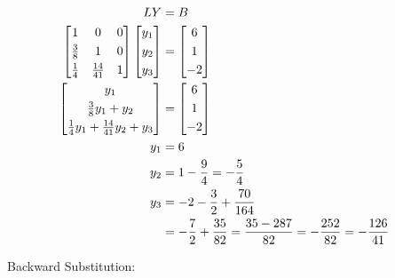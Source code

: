 	\begin{align}
		LY &= B& \\
		\begin{bmatrix}
			1 & 0 & 0 \\[0.3em]
			\frac{3}{8} & 1 & 0 \\[0.3em]
			\frac{1}{4} & \frac{14}{41} & 1
		\end{bmatrix}
		\begin{bmatrix}
			y_{1} \\[0.3em]
			y_{2} \\[0.3em]
			y_{3}
		\end{bmatrix} &= \begin{bmatrix}
				6 \\[0.3em]
				1 \\[0.3em]
				-2
			\end{bmatrix}& \notag \\
		\begin{bmatrix}
			y_{1} \\[0.3em]
			\frac{3}{8}y_{1} + y_{2} \\[0.3em]
			\frac{1}{4}y_{1} + \frac{14}{41}y_{2} + y_{3}
		\end{bmatrix} &= \begin{bmatrix}
				6 \\[0.3em]
				1 \\[0.3em]
				-2
			\end{bmatrix}& \notag \\
		y_{1} &= 6& \\
		y_{2} &= 1 - \frac{9}{4} = - \frac{5}{4}& \\
		y_{3} &= - 2 - \frac{3}{2} + \frac{70}{164}& \notag \\
		&= - \frac{7}{2} + \frac{35}{82} = \frac{35-287}{82} = -\frac{252}{82} = -\frac{126}{41}&
	\label{eq:51y}
	\end{align}

	Backward Substitution:

